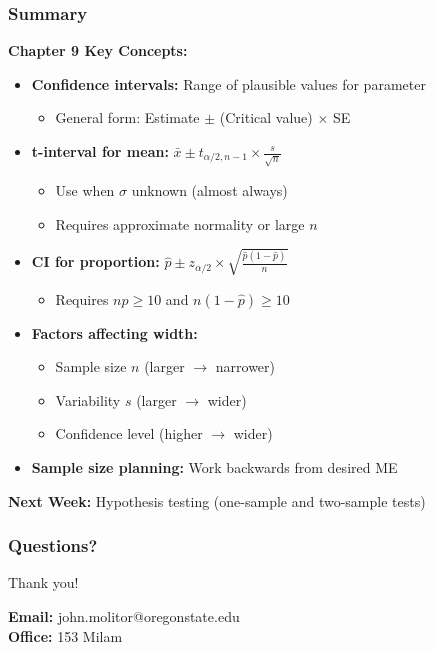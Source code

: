 \documentclass{beamer}
\begin{document}
\begin{frame}
\frametitle{Summary}
\textbf{Chapter 9 Key Concepts:}
\begin{itemize}
\item \textbf{Confidence intervals:} Range of plausible values for parameter
  \begin{itemize}
  \item General form: Estimate $\pm$ (Critical value) $\times$ SE
  \end{itemize}
\item \textbf{t-interval for mean:} $\bar{x} \pm t_{\alpha/2, n-1} \times \frac{s}{\sqrt{n}}$
  \begin{itemize}
  \item Use when $\sigma$ unknown (almost always)
  \item Requires approximate normality or large $n$
  \end{itemize}
\item \textbf{CI for proportion:} $\hat{p} \pm z_{\alpha/2} \times \sqrt{\frac{\hat{p}(1-\hat{p})}{n}}$
  \begin{itemize}
  \item Requires $n\hat{p} \geq 10$ and $n(1-\hat{p}) \geq 10$
  \end{itemize}
\item \textbf{Factors affecting width:}
  \begin{itemize}
  \item Sample size $n$ (larger $\to$ narrower)
  \item Variability $s$ (larger $\to$ wider)
  \item Confidence level (higher $\to$ wider)
  \end{itemize}
\item \textbf{Sample size planning:} Work backwards from desired ME
\end{itemize}

\vspace{0.3cm}
\textbf{Next Week:} Hypothesis testing (one-sample and two-sample tests)
\end{frame}

\begin{frame}
\frametitle{Questions?}
\begin{center}
\Large{Thank you!}

\vspace{1cm}

\textbf{Email:} john.molitor@oregonstate.edu\\
\textbf{Office:} 153 Milam
\end{center}
\end{frame}
\end{document}
